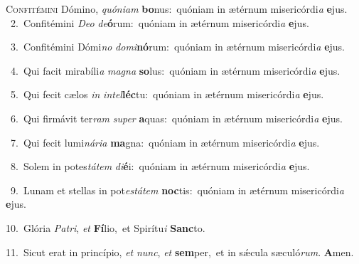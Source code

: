 \lettrine{\initial\textcolor{\initialcolor}{C}}{onfitémini} Dómino, \textit{quón}\-\textit{i}\textit{am} \textbf{bo}\-nus:~\star quóniam in ætérnum misericórdi\textit{a} \textbf{e}\-jus.\\
{\numbfont\textcolor{\numbcolor}{~2.}}~Confitémini \textit{De}\-\textit{o} \textit{de}\-\textbf{ó}rum:~\star quóniam in ætérnum misericórdi\textit{a} \textbf{e}\-jus.\par
{\numbfont\textcolor{\numbcolor}{~3.}}~Confitémini Dómi\textit{no} \textit{do}\-\textit{mi}\textbf{nó}rum:~\star quóniam in ætérnum misericórdi\textit{a} \textbf{e}\-jus.\par
{\numbfont\textcolor{\numbcolor}{~4.}}~Qui facit mirabíli\textit{a} \textit{ma}\-\textit{gna} \textbf{so}\-lus:~\star quóniam in ætérnum misericórdi\textit{a} \textbf{e}\-jus.\par
{\numbfont\textcolor{\numbcolor}{~5.}}~Qui fecit cælos \textit{in} \textit{in}\-\textit{tel}\textbf{léc}tu:~\star quóniam in ætérnum misericórdi\textit{a} \textbf{e}\-jus.\par
{\numbfont\textcolor{\numbcolor}{~6.}}~Qui firmávit ter\textit{ram} \textit{su}\-\textit{per} \textbf{a}\-quas:~\star quóniam in ætérnum misericórdi\textit{a} \textbf{e}\-jus.\par
{\numbfont\textcolor{\numbcolor}{~7.}}~Qui fecit lumi\-\textit{ná}\-\textit{ri}\textit{a} \textbf{ma}\-gna:~\star quóniam in ætérnum misericórdi\textit{a} \textbf{e}\-jus.\par
{\numbfont\textcolor{\numbcolor}{~8.}}~Solem in potes\-\textit{tá}\-\textit{tem} \textit{di}\-\textbf{é}i:~\star quóniam in ætérnum misericórdi\textit{a} \textbf{e}\-jus.\par
{\numbfont\textcolor{\numbcolor}{~9.}}~Lunam et stellas in pot\-\textit{es}\-\textit{tá}\textit{tem} \textbf{noc}\-tis:~\star quóniam in ætérnum misericórdi\textit{a} \textbf{e}\-jus.\par
{\numbfont\textcolor{\numbcolor}{10.}}~Glória \textit{Pa}\-\textit{tri}, \textit{et} \textbf{Fí}\-lio,~\star et Spirítu\textit{i} \textbf{Sanc}\-to.\par
{\numbfont\textcolor{\numbcolor}{11.}}~Sicut erat in princípio, \textit{et} \textit{nunc}\-, \textit{et} \textbf{sem}\-per,~\star et in sǽcula sæculó\-\textit{rum}\-. \textbf{A}\-men.\par

